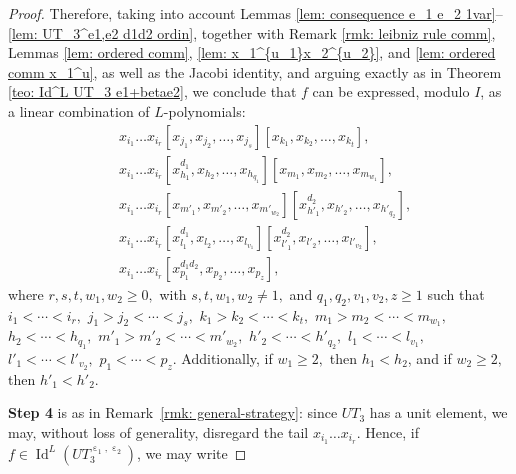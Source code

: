 \documentclass[a4paper,reqno]{amsart}
\theoremstyle{definition}
\numberwithin{equation}{section}
\numberwithin{theorem}{section}
\DeclareMathOperator{\I}{Id}
\DeclareMathOperator{\e}{\varepsilon}
\begin{document}
\begin{proof}
Therefore, taking into account Lemmas \ref{lem: consequence e_1 e_2 1var}–\ref{lem: UT_3^e1,e2 d1d2 ordin}, together with Remark \ref{rmk: leibniz rule comm}, Lemmas \ref{lem: ordered comm}, \ref{lem: x_1^{u_1}x_2^{u_2}}, and \ref{lem: ordered comm x_1^u}, as well as the Jacobi identity, and arguing exactly as in Theorem \ref{teo: Id^L UT_3 e1+betae2}, we conclude that $f$  can be expressed, modulo $I$, as a linear combination of $L$-polynomials:
\begin{equation} \label{No Id UT_3e1e2}
\begin{split}
&x_{i_{1}}\dots x_{i_{r}}[x_{j_1},x_{j_2},\dots,x_{j_s}][x_{k_1},x_{k_2},\dots,x_{k_t}],\\
&x_{i_{1}}\dots x_{i_{r}}[x_{h_1}^{d_{1}},x_{h_2},\dots,x_{h_{q_1}}][x_{m_1},x_{m_2},\dots,x_{m_{w_1}}],\\
&x_{i_{1}}\dots x_{i_{r}}[x_{m'_1},x_{m'_2},\dots,x_{m'_{w_2}}][x_{h'_1}^{d_{2}},x_{h'_2},\dots,x_{h'_{q_2}}],\\
&x_{i_{1}}\dots x_{i_{r}}[x_{l_1}^{d_{1}},x_{l_2},\dots,x_{l_{v_1}}][x_{l'_1}^{d_{2}},x_{l'_2},\dots,x_{l'_{v_2}}],\\
&x_{i_{1}}\dots x_{i_{r}}[x_{p_1}^{d_1d_2},x_{p_2},\dots,x_{p_z}],
\end{split}
\end{equation}
where $r,s,t, w_1, w_2 \geq 0,$ with $s,t,w_1,w_2\neq 1,$ and $q_1,q_2,v_1,v_2,z\geq 1$ such that $i_1< \cdots < i_r,$ $j_1>j_2<  \cdots < j_s,$ $k_1>k_2<  \cdots < k_t,$ 
$m_1> m_2< \cdots < m_{w_1},$ $h_2< \cdots <h_{q_1},$  $m'_1> m'_2< \cdots < m'_{w_2},$  $h'_2< \cdots <h'_{q_2},$
$l_1< \cdots < l_{v_1},$ $l'_1< \cdots < l'_{v_2},$ $p_1< \cdots < p_z.$ Additionally, if $w_1\geq 2,$ then $h_1< h_2$, and  if $w_2\geq 2,$ then $h'_1< h'_2.$


\textbf{Step 4} is as in Remark~\ref{rmk: general-strategy}: since $UT_3$ has a unit element, we may,
without loss of generality, disregard the tail $x_{i_{1}}\dots x_{i_{r}}$. Hence, if $f\in \I^L(UT_3^{\e_1,\e_2})$, we may write


\end{proof}
\end{document}
